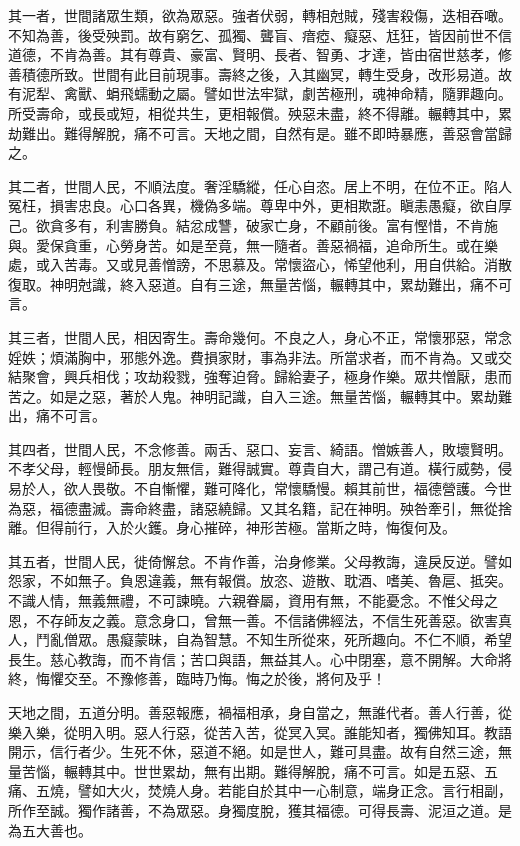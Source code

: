 \documentclass{zhvt-classic}
\begin{document}
其一者，世間諸眾生類，欲為眾惡。強者伏弱，轉相尅賊，殘害殺傷，迭相吞噉。不知為善，後受殃罰。故有窮乞、孤獨、聾盲、瘖瘂、癡惡、尪狂，皆因前世不信道德，不肯為善。其有尊貴、豪富、賢明、長者、智勇、才達，皆由宿世慈孝，修善積德所致。世間有此目前現事。壽終之後，入其幽冥，轉生受身，改形易道。故有泥犁、禽獸、蜎飛蠕動之屬。譬如世法牢獄，劇苦極刑，魂神命精，隨罪趣向。所受壽命，或長或短，相從共生，更相報償。殃惡未盡，終不得離。輾轉其中，累劫難出。難得解脫，痛不可言。天地之間，自然有是。雖不即時暴應，善惡會當歸之。

其二者，世間人民，不順法度。奢淫驕縱，任心自恣。居上不明，在位不正。陷人冤枉，損害忠良。心口各異，機偽多端。尊卑中外，更相欺誑。瞋恚愚癡，欲自厚己。欲貪多有，利害勝負。結忿成讐，破家亡身，不顧前後。富有慳惜，不肯施與。愛保貪重，心勞身苦。如是至竟，無一隨者。善惡禍福，追命所生。或在樂處，或入苦毒。又或見善憎謗，不思慕及。常懷盜心，悕望他利，用自供給。消散復取。神明尅識，終入惡道。自有三途，無量苦惱，輾轉其中，累劫難出，痛不可言。

其三者，世間人民，相因寄生。壽命幾何。不良之人，身心不正，常懷邪惡，常念婬妷；煩滿胸中，邪態外逸。費損家財，事為非法。所當求者，而不肯為。又或交結聚會，興兵相伐；攻劫殺戮，強奪迫脅。歸給妻子，極身作樂。眾共憎厭，患而苦之。如是之惡，著於人鬼。神明記識，自入三途。無量苦惱，輾轉其中。累劫難出，痛不可言。

其四者，世間人民，不念修善。兩舌、惡口、妄言、綺語。憎嫉善人，敗壞賢明。不孝父母，輕慢師長。朋友無信，難得誠實。尊貴自大，謂己有道。橫行威勢，侵易於人，欲人畏敬。不自慚懼，難可降化，常懷驕慢。賴其前世，福德營護。今世為惡，福德盡滅。壽命終盡，諸惡繞歸。又其名籍，記在神明。殃咎牽引，無從捨離。但得前行，入於火鑊。身心摧碎，神形苦極。當斯之時，悔復何及。

其五者，世間人民，徙倚懈怠。不肯作善，治身修業。父母教誨，違戾反逆。譬如怨家，不如無子。負恩違義，無有報償。放恣、遊散、耽酒、嗜美、魯扈、抵突。不識人情，無義無禮，不可諫曉。六親眷屬，資用有無，不能憂念。不惟父母之恩，不存師友之義。意念身口，曾無一善。不信諸佛經法，不信生死善惡。欲害真人，鬥亂僧眾。愚癡蒙昧，自為智慧。不知生所從來，死所趣向。不仁不順，希望長生。慈心教誨，而不肯信；苦口與語，無益其人。心中閉塞，意不開解。大命將終，悔懼交至。不豫修善，臨時乃悔。悔之於後，將何及乎！

天地之間，五道分明。善惡報應，禍福相承，身自當之，無誰代者。善人行善，從樂入樂，從明入明。惡人行惡，從苦入苦，從冥入冥。誰能知者，獨佛知耳。教語開示，信行者少。生死不休，惡道不絕。如是世人，難可具盡。故有自然三途，無量苦惱，輾轉其中。世世累劫，無有出期。難得解脫，痛不可言。如是五惡、五痛、五燒，譬如大火，焚燒人身。若能自於其中一心制意，端身正念。言行相副，所作至誠。獨作諸善，不為眾惡。身獨度脫，獲其福德。可得長壽、泥洹之道。是為五大善也。
\end{document}

